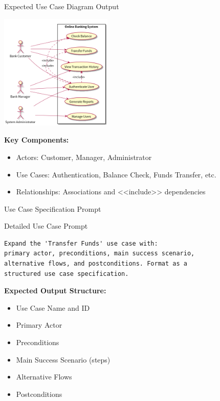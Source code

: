 \documentclass{beamer}
\begin{document}
\begin{frame}[t]{Expected Use Case Diagram Output}
    \begin{center}
        \includegraphics[width=0.4\textwidth]{images/uc.png} %
    \end{center}
    
    \textbf{Key Components:}
    \begin{itemize}
        \item Actors: Customer, Manager, Administrator
        \item Use Cases: Authentication, Balance Check, Funds Transfer, etc.
        \item Relationships: Associations and <<include>> dependencies
    \end{itemize}
\end{frame}

\begin{frame}[fragile]{Use Case Specification Prompt}
    \begin{block}{Detailed Use Case Prompt}
        \lstset{style=code}
        \begin{lstlisting}
Expand the 'Transfer Funds' use case with: 
primary actor, preconditions, main success scenario, 
alternative flows, and postconditions. Format as a 
structured use case specification.
        \end{lstlisting}
    \end{block}
    
    \textbf{Expected Output Structure:}
    \begin{itemize}
        \item Use Case Name and ID
        \item Primary Actor
        \item Preconditions
        \item Main Success Scenario (steps)
        \item Alternative Flows
        \item Postconditions
    \end{itemize}
\end{frame}
\end{document}

